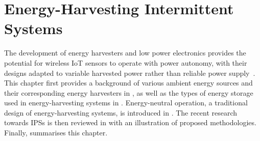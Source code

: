 \chapter{Energy-Harvesting Intermittent Systems} \label{chapter:review}

The development of energy harvesters and low power electronics provides the potential for wireless IoT sensors to operate with power autonomy, with their designs adapted to variable harvested power rather than reliable power supply~\cite{miorandi2012internet}. 
This chapter first provides a background of various ambient energy sources and their corresponding energy harvesters in , as well as the types of energy storage used in energy-harvesting systems in . 
Energy-neutral operation, a traditional design of energy-harvesting systems, is introduced in . 
The recent research towards IPSs is then reviewed in  with an illustration of proposed methodologies.
Finally,  summarises this chapter. 






